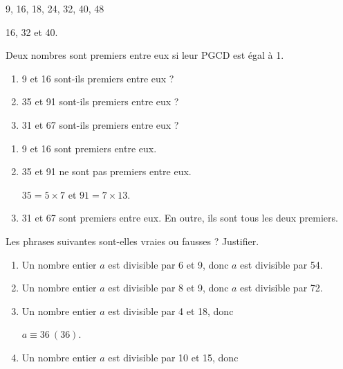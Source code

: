 \begin{autoeval}
\begin{multicols}{2}
\begin{exercice}
          \vspace{-10pt} 
          \begin{center}
            9, 16, 18, 24, 32, 40, 48
          \end{center}
          \vspace{-10pt}
	\end{exercice}
	\begin{corrige}
	16, 32 et 40.
	\end{corrige}
	
        \smallskip{}

	\begin{exercice}
          Deux nombres sont premiers entre eux si leur PGCD est égal à
          1.
 \begin{enumerate}
 \item 9 et 16 sont-ils premiers entre eux ? 
 \item 35 et 91 sont-ils premiers entre eux ?
 \item 31 et 67 sont-ils premiers entre eux ?
 \end{enumerate}
	\end{exercice}
	\begin{corrige}
	\begin{enumerate}
	\item	9 et 16 sont premiers entre eux.
	\item 35 et 91 ne sont pas premiers entre eux. 

          $35=5\times7$ et $91=7\times13$.

	\item 31 et 67 sont premiers entre eux. En outre, ils sont tous les deux
          premiers.
        \end{enumerate}
      \end{corrige}
	
        \smallskip{}

	\begin{exercice}
          Les phrases suivantes sont-elles vraies ou fausses ?
          Justifier.
	\begin{enumerate}
	\item Un nombre entier $a$ est divisible par 6 et 9, donc $a$
          est divisible par 54.
	\item Un nombre entier $a$ est divisible par 8 et 9, donc $a$
          est divisible par 72.
	\item Un nombre entier $a$ est divisible par 4 et 18, donc
	
	$a\equiv36~(36)$.
      \item Un nombre entier $a$ est divisible par 10 et 15, donc
	

\end{enumerate}
\end{exercice}
\end{multicols}
\end{autoeval}

